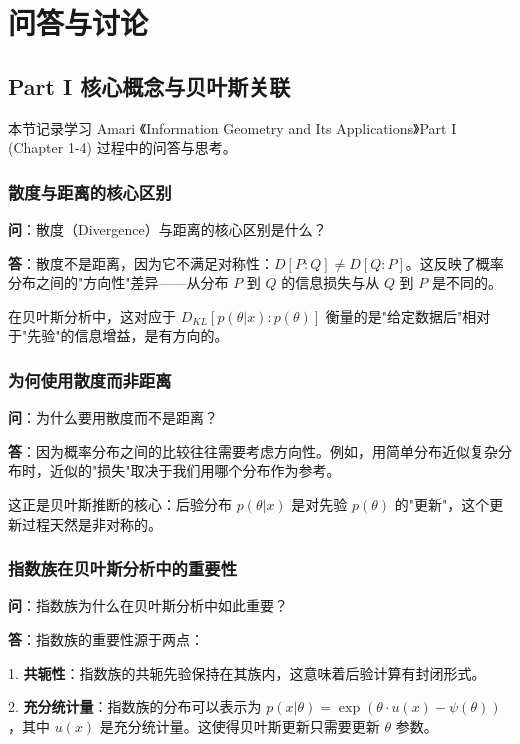 \appendix
\chapter{问答与讨论}

\section{Part I 核心概念与贝叶斯关联}

本节记录学习 Amari 《Information Geometry and Its Applications》Part I (Chapter 1-4) 过程中的问答与思考。

\subsection{散度与距离的核心区别}\label{sec:qa-divergence-vs-distance}

\textbf{问}：散度（Divergence）与距离的核心区别是什么？

\textbf{答}：散度不是距离，因为它不满足对称性：$D[P:Q] \neq D[Q:P]$。这反映了概率分布之间的"方向性"差异——从分布 $P$ 到 $Q$ 的信息损失与从 $Q$ 到 $P$ 是不同的。

在贝叶斯分析中，这对应于 $D_{KL}[p(\theta|x):p(\theta)]$ 衡量的是"给定数据后"相对于"先验"的信息增益，是有方向的。

\subsection{为何使用散度而非距离}\label{sec:qa-why-divergence}

\textbf{问}：为什么要用散度而不是距离？

\textbf{答}：因为概率分布之间的比较往往需要考虑方向性。例如，用简单分布近似复杂分布时，近似的"损失"取决于我们用哪个分布作为参考。

这正是贝叶斯推断的核心：后验分布 $p(\theta|x)$ 是对先验 $p(\theta)$ 的"更新"，这个更新过程天然是非对称的。

\subsection{指数族在贝叶斯分析中的重要性}\label{sec:qa-exponential-family-bayesian}

\textbf{问}：指数族为什么在贝叶斯分析中如此重要？

\textbf{答}：指数族的重要性源于两点：

1. \textbf{共轭性}：指数族的共轭先验保持在其族内，这意味着后验计算有封闭形式。

2. \textbf{充分统计量}：指数族的分布可以表示为 $p(x|\theta) = \exp(\theta \cdot u(x) - \psi(\theta))$，其中 $u(x)$ 是充分统计量。这使得贝叶斯更新只需要更新 $\theta$ 参数。

